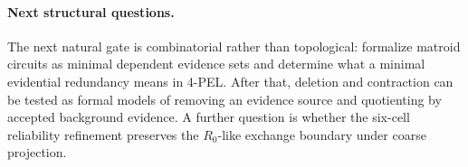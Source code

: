 \paragraph{Next structural questions.}
The next natural gate is combinatorial rather than topological: formalize
matroid circuits as minimal dependent evidence sets and determine what a
minimal evidential redundancy means in 4-PEL. After that, deletion and
contraction can be tested as formal models of removing an evidence source and
quotienting by accepted background evidence. A further question is whether the
six-cell reliability refinement preserves the \(R_0\)-like exchange boundary
under coarse projection.
